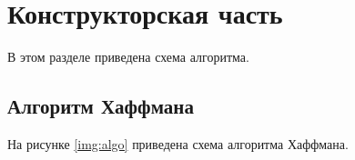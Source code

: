 \chapter{Конструкторская часть}
В этом разделе приведена схема алгоритма.

\section{Алгоритм Хаффмана}
На рисунке \ref{img:algo} приведена схема алгоритма Хаффмана.

\clearpage


